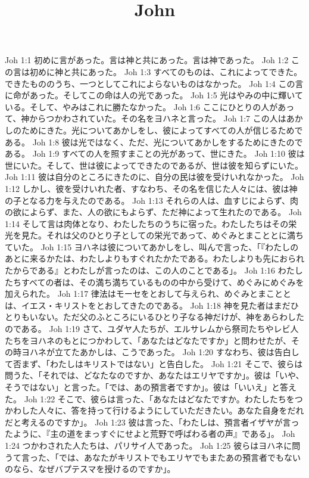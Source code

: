 

\title{John}

Joh 1:1  初めに言があった。言は神と共にあった。言は神であった。
Joh 1:2  この言は初めに神と共にあった。
Joh 1:3  すべてのものは、これによってできた。できたもののうち、一つとしてこれによらないものはなかった。
Joh 1:4  この言に命があった。そしてこの命は人の光であった。
Joh 1:5  光はやみの中に輝いている。そして、やみはこれに勝たなかった。
Joh 1:6  ここにひとりの人があって、神からつかわされていた。その名をヨハネと言った。
Joh 1:7  この人はあかしのためにきた。光についてあかしをし、彼によってすべての人が信じるためである。
Joh 1:8  彼は光ではなく、ただ、光についてあかしをするためにきたのである。
Joh 1:9  すべての人を照すまことの光があって、世にきた。
Joh 1:10  彼は世にいた。そして、世は彼によってできたのであるが、世は彼を知らずにいた。
Joh 1:11  彼は自分のところにきたのに、自分の民は彼を受けいれなかった。
Joh 1:12  しかし、彼を受けいれた者、すなわち、その名を信じた人々には、彼は神の子となる力を与えたのである。
Joh 1:13  それらの人は、血すじによらず、肉の欲によらず、また、人の欲にもよらず、ただ神によって生れたのである。
Joh 1:14  そして言は肉体となり、わたしたちのうちに宿った。わたしたちはその栄光を見た。それは父のひとり子としての栄光であって、めぐみとまこととに満ちていた。
Joh 1:15  ヨハネは彼についてあかしをし、叫んで言った、「『わたしのあとに来るかたは、わたしよりもすぐれたかたである。わたしよりも先におられたからである』とわたしが言ったのは、この人のことである」。
Joh 1:16  わたしたちすべての者は、その満ち満ちているものの中から受けて、めぐみにめぐみを加えられた。
Joh 1:17  律法はモーセをとおして与えられ、めぐみとまこととは、イエス・キリストをとおしてきたのである。
Joh 1:18  神を見た者はまだひとりもいない。ただ父のふところにいるひとり子なる神だけが、神をあらわしたのである。
Joh 1:19  さて、ユダヤ人たちが、エルサレムから祭司たちやレビ人たちをヨハネのもとにつかわして、「あなたはどなたですか」と問わせたが、その時ヨハネが立てたあかしは、こうであった。
Joh 1:20  すなわち、彼は告白して否まず、「わたしはキリストではない」と告白した。
Joh 1:21  そこで、彼らは問うた、「それでは、どなたなのですか、あなたはエリヤですか」。彼は「いや、そうではない」と言った。「では、あの預言者ですか」。彼は「いいえ」と答えた。
Joh 1:22  そこで、彼らは言った、「あなたはどなたですか。わたしたちをつかわした人々に、答を持って行けるようにしていただきたい。あなた自身をだれだと考えるのですか」。
Joh 1:23  彼は言った、「わたしは、預言者イザヤが言ったように、『主の道をまっすぐにせよと荒野で呼ばわる者の声』である」。
Joh 1:24  つかわされた人たちは、パリサイ人であった。
Joh 1:25  彼らはヨハネに問うて言った、「では、あなたがキリストでもエリヤでもまたあの預言者でもないのなら、なぜバプテスマを授けるのですか」。
